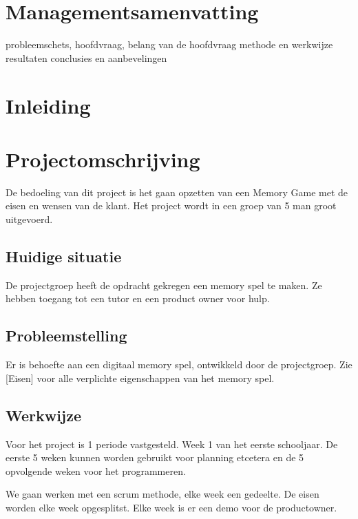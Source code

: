 \documentclass[a4paper,titlepage,11pt]{article}
\begin{document}
\section{Managementsamenvatting}

probleemschets, hoofdvraag, belang van de hoofdvraag
methode en werkwijze
resultaten
conclusies en aanbevelingen

\clearpage

\section{Inleiding}

\clearpage

\section{Projectomschrijving}

De bedoeling van dit project is het gaan opzetten van een Memory Game met de eisen en wensen van de klant. Het project wordt in een groep van 5 man groot uitgevoerd.

\subsection{Huidige situatie}

De projectgroep heeft de opdracht gekregen een memory spel te maken. Ze hebben toegang tot een tutor en een product owner voor hulp.

\subsection{Probleemstelling}

Er is behoefte aan een digitaal memory spel, ontwikkeld door de projectgroep. Zie [Eisen] voor alle verplichte eigenschappen van het memory spel.

\subsection{Werkwijze}

Voor het project is 1 periode vastgesteld. Week 1 van het eerste schooljaar. De eerste 5 weken kunnen worden gebruikt voor planning etcetera en de 5 opvolgende weken voor het programmeren.

We gaan werken met een scrum methode, elke week een gedeelte. De eisen worden elke week opgesplitst. Elke week is er een demo voor de productowner.
\end{document}
